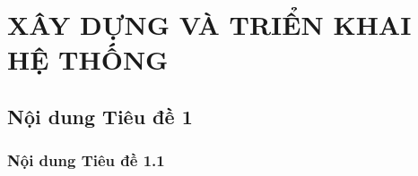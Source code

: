 \chapter{XÂY DỰNG VÀ TRIỂN KHAI HỆ THỐNG}

\section{Nội dung Tiêu đề 1}
\subsection{Nội dung Tiêu đề 1.1}
